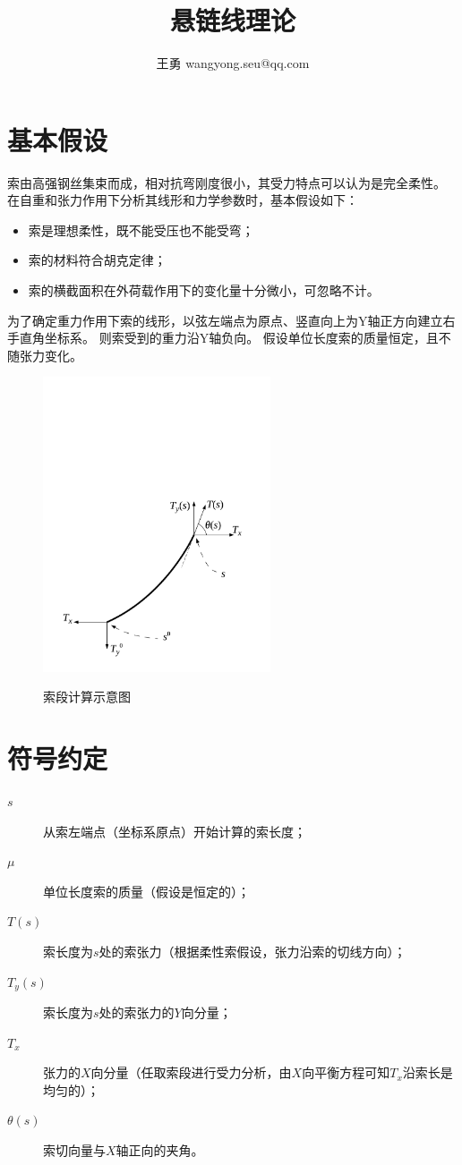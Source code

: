 \documentclass{article}
\title{悬链线理论}
\author{王勇 wangyong.seu@qq.com}
\begin{document}
\maketitle
\section{基本假设}
索由高强钢丝集束而成，相对抗弯刚度很小，其受力特点可以认为是完全柔性。
在自重和张力作用下分析其线形和力学参数时，基本假设如下：

\begin{itemize}
  \item
  索是理想柔性，既不能受压也不能受弯；
  \item
  索的材料符合胡克定律；
  \item
  索的横截面积在外荷载作用下的变化量十分微小，可忽略不计。
\end{itemize}

为了确定重力作用下索的线形，以弦左端点为原点、竖直向上为Y轴正方向建立右手直角坐标系。
则索受到的重力沿Y轴负向。
假设单位长度索的质量恒定，且不随张力变化。

\begin{figure}
  \centering
  \includegraphics[width=0.6\textwidth]{./fig/catenary_diagram.pdf}
  \label{fig:catenary}
  \caption{索段计算示意图}
\end{figure}

\section{符号约定}
\begin{description}
  \item[$s$]
  从索左端点（坐标系原点）开始计算的索长度；
  \item[$\mu$]
  单位长度索的质量（假设是恒定的）；
  \item[$T(s)$]
  索长度为$s$处的索张力（根据柔性索假设，张力沿索的切线方向）；
  \item[$T_y(s)$]
  索长度为$s$处的索张力的$Y$向分量；
  \item[$T_x$]
  张力的$X$向分量（任取索段进行受力分析，由$X$向平衡方程可知$T_x$沿索长是均匀的）；
  \item[$\theta(s)$]
  索切向量与$X$轴正向的夹角。
\end{description}
\end{document}
